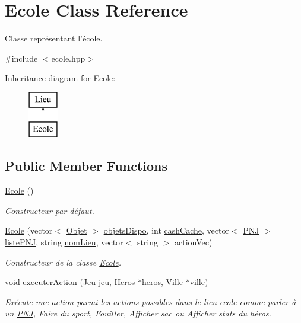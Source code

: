 \hypertarget{class_ecole}{\section{Ecole Class Reference}
\label{class_ecole}
}


Classe représentant l'école.  




{\ttfamily \#include $<$ecole.\-hpp$>$}

Inheritance diagram for Ecole\-:\begin{figure}[H]
\begin{center}
\leavevmode
\includegraphics[height=2.000000cm]{class_ecole}
\end{center}
\end{figure}
\subsection*{Public Member Functions}
\begin{DoxyCompactItemize}
\item 
\hyperlink{class_ecole_a7bab5ff4118af8c59da282b62151653e}{Ecole} ()
\begin{DoxyCompactList}\small\item\em Constructeur par défaut. \end{DoxyCompactList}\item 
\hyperlink{class_ecole_a1630c88a0ebf2ce9e0e5220d1baaa34a}{Ecole} (vector$<$ \hyperlink{class_objet}{Objet} $>$ \hyperlink{class_lieu_a3a65fbb8ecba3f2e265905730ad2e631}{objets\-Dispo}, int \hyperlink{class_lieu_a90b76b521f92a43626ccd29ed5a29f89}{cash\-Cache}, vector$<$ \hyperlink{class_p_n_j}{P\-N\-J} $>$ \hyperlink{class_lieu_a8c1e20b105f7972f22d8f16651de4ebd}{liste\-P\-N\-J}, string \hyperlink{class_lieu_a1e48889fe5c581f043b8bd77ca497fc7}{nom\-Lieu}, vector$<$ string $>$ action\-Vec)
\begin{DoxyCompactList}\small\item\em Constructeur de la classe \hyperlink{class_ecole}{Ecole}. \end{DoxyCompactList}\item 
void \hyperlink{class_ecole_a717229b0b7a96d0093aa8b72db752ccd}{executer\-Action} (\hyperlink{class_jeu}{Jeu} jeu, \hyperlink{class_heros}{Heros} $\ast$heros, \hyperlink{class_ville}{Ville} $\ast$ville)
\begin{DoxyCompactList}\small\item\em Exécute une action parmi les actions possibles dans le lieu ecole comme parler à un \hyperlink{class_p_n_j}{P\-N\-J}, Faire du sport, Fouiller, Afficher sac ou Afficher stats du héros. \end{DoxyCompactList}\end{DoxyCompactItemize}
